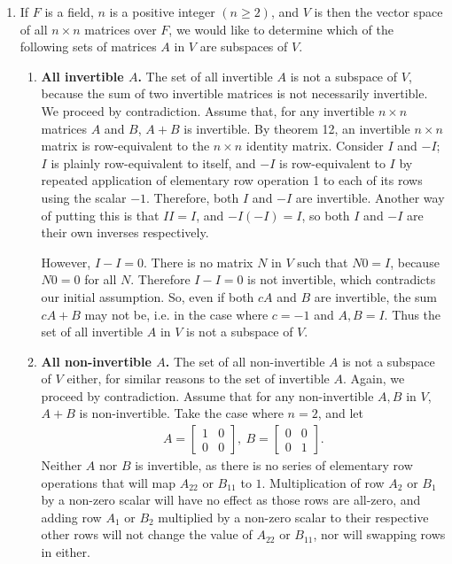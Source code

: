 \documentclass[12pt]{article}
\begin{document}
\begin{enumerate}
    \item
      If $F$ is a field, $n$ is a positive integer $(n \geq 2)$, and $V$ is then the
      vector space of all $n \times n$ matrices over $F$, we would like to determine
      which of the following sets of matrices $A$ in $V$ are subspaces of $V$.
      \begin{enumerate}
        \item
          \textbf{All invertible $A$.} The set of all invertible $A$ is not a
          subspace of $V$, because the sum of two invertible matrices is not
          necessarily invertible. We proceed by contradiction. Assume that, for any
          invertible $n \times n$ matrices $A$ and $B$, $A + B$ is invertible. By
          theorem 12, an invertible $n \times n$ matrix is row-equivalent to the $n
          \times n$ identity matrix. Consider $I$ and $-I$; $I$ is plainly
          row-equivalent to itself, and $-I$ is row-equivalent to $I$ by repeated
          application of elementary row operation 1 to each of its rows using the
          scalar $-1$. Therefore, both $I$ and $-I$ are invertible. Another way of
          putting this is that $II = I$, and $-I(-I) = I$, so both $I$ and $-I$ are
          their own inverses respectively.

          However, $I - I = 0$. There is no matrix $N$ in $V$ such that $N0 = I$,
          because $N0 = 0$ for all $N$. Therefore $I - I = 0$ is not invertible,
          which contradicts our initial assumption. So, even if both $cA$ and $B$ are
          invertible, the sum $cA + B$ may not be, i.e. in the case where $c = -1$
          and $A,B = I$. Thus the set of all invertible $A$ in $V$ is not a subspace
          of $V$.

        \item
          \textbf{All non-invertible $A$.} The set of all non-invertible $A$ is not a
          subspace of $V$ either, for similar reasons to the set of invertible $A$.
          Again, we proceed by contradiction. Assume that for any non-invertible
          $A,B$ in $V$, $A + B$ is non-invertible. Take the case where $n = 2$, and
          let
          \begin{align*}
            A =
            \begin{bmatrix}
              1 & 0\\
              0 & 0
            \end{bmatrix},\
            B =
            \begin{bmatrix}
              0 & 0\\
              0 & 1
            \end{bmatrix}.
          \end{align*}
          Neither $A$ nor $B$ is invertible, as there is no series of elementary row
          operations that will map $A_{22}$ or $B_{11}$ to $1$. Multiplication of row
          $A_{2}$ or $B_{1}$ by a non-zero scalar will have no effect as those rows
          are all-zero, and adding row $A_{1}$ or $B_{2}$ multiplied by a non-zero
          scalar to their respective other rows will not change the value of $A_{22}$
          or $B_{11}$, nor will swapping rows in either.


\end{enumerate}
\end{enumerate}
\end{document}
